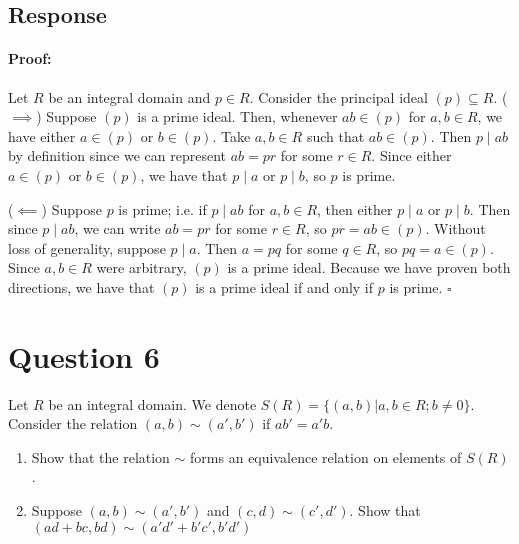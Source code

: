 \documentclass [12pt] {article}
\newenvironment{proof}{\paragraph{Proof:}}{\hfill$\square$}
\begin{document}
\subsection*{Response}
\begin{proof}
    Let $R$ be an integral domain and $p \in R$. Consider the principal ideal $(p) \subseteq R$.
    \newline
    ($\implies$)
    Suppose $(p)$ is a prime ideal. Then, whenever $ab \in (p)$ for $a, b \in R$, we have either
    $a \in (p)$ or $b \in (p)$. Take $a, b \in R$ such that $ab \in (p)$. Then $p \mid ab$ by definition
    since we can represent $ab = pr$ for some $r \in R$. Since either $a \in (p)$ or $b \in (p)$,
    we have that $p \mid a$ or $p \mid b$, so $p$ is prime.
    \vspace{1em}

    ($\impliedby$)
    Suppose $p$ is prime; i.e. if $p \mid ab$ for $a, b \in R$, then either $p \mid a$ or $p \mid b$.
    Then since $p \mid ab$, we can write $ab = pr$ for some $r \in R$, so $pr = ab \in (p)$. Without
    loss of generality, suppose $p \mid a$. Then $a = pq$ for some $q \in R$, so $pq = a \in (p)$.
    Since $a, b \in R$ were arbitrary, $(p)$ is a prime ideal. Because we have proven both
    directions, we have that $(p)$ is a prime ideal if and only if $p$ is prime.
\end{proof}
\newpage


\section*{Question 6}
Let $R$ be an integral domain. We denote $S(R)=\{(a,b)|a,b\in R;b\neq 0\}$. Consider the relation
$(a,b)\sim (a',b')$ if $ab'=a'b$.
\begin{enumerate}
    \item Show that the relation $\sim$ forms an equivalence relation on elements of $S(R)$.
    \item Suppose $(a,b)\sim (a',b')$ and $(c,d)\sim (c',d')$. Show that
        $(ad+bc,bd)\sim (a'd'+b'c',b'd')$
\end{enumerate}
\end{document}
